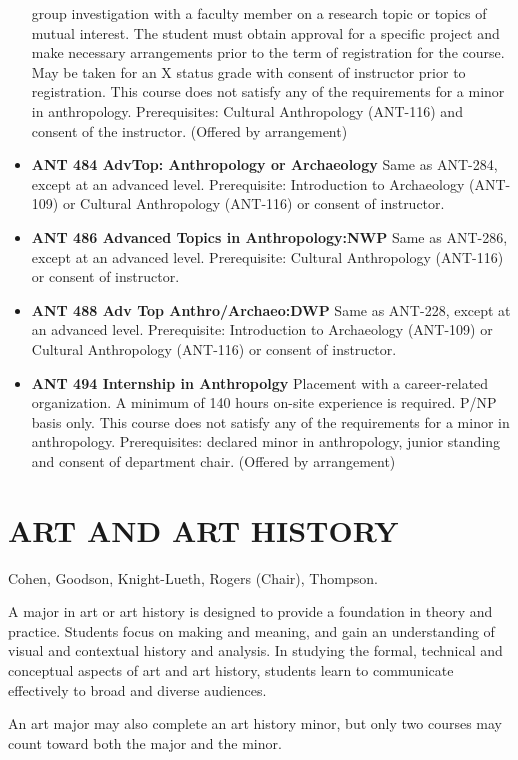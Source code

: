 \documentclass[
  letterpaper,
]{scrbook}
\begin{document}
\begin{itemize}
  group investigation with a faculty member on a research topic or
  topics of mutual interest. The student must obtain approval for a
  specific project and make necessary arrangements prior to the term of
  registration for the course. May be taken for an X status grade with
  consent of instructor prior to registration. This course does not
  satisfy any of the requirements for a minor in anthropology.
  Prerequisites: Cultural Anthropology (ANT-116) and consent of the
  instructor. (Offered by arrangement)
\item
  \textbf{ANT 484 AdvTop: Anthropology or Archaeology} Same as ANT-284,
  except at an advanced level. Prerequisite: Introduction to Archaeology
  (ANT-109) or Cultural Anthropology (ANT-116) or consent of instructor.
\item
  \textbf{ANT 486 Advanced Topics in Anthropology:NWP} Same as ANT-286,
  except at an advanced level. Prerequisite: Cultural Anthropology
  (ANT-116) or consent of instructor.
\item
  \textbf{ANT 488 Adv Top Anthro/Archaeo:DWP} Same as ANT-228, except at
  an advanced level. Prerequisite: Introduction to Archaeology (ANT-109)
  or Cultural Anthropology (ANT-116) or consent of instructor.
\item
  \textbf{ANT 494 Internship in Anthropolgy} Placement with a
  career-related organization. A minimum of 140 hours on-site experience
  is required. P/NP basis only. This course does not satisfy any of the
  requirements for a minor in anthropology. Prerequisites: declared
  minor in anthropology, junior standing and consent of department
  chair. (Offered by arrangement)
\end{itemize}

\hypertarget{art-and-art-history}{%
\section{ART AND ART HISTORY}\label{art-and-art-history}}

Cohen, Goodson, Knight-Lueth, Rogers (Chair), Thompson.

A major in art or art history is designed to provide a foundation in
theory and practice. Students focus on making and meaning, and gain an
understanding of visual and contextual history and analysis. In studying
the formal, technical and conceptual aspects of art and art history,
students learn to communicate effectively to broad and diverse
audiences.

An art major may also complete an art history minor, but only two
courses may count toward both the major and the minor.
\end{document}
